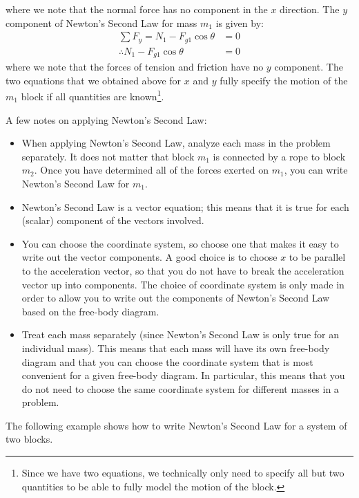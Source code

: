 where we note that the normal force has no component in the $x$ direction. The $y$ component of Newton's Second Law for mass $m_1$ is given by:
\begin{align*}
\sum F_y = N_1-F_{g1}\cos\theta&=0\\
\therefore N_1-F_{g1}\cos\theta&=0
\end{align*}
where we note that the forces of tension and friction have no $y$ component. The two equations that we obtained above for $x$ and $y$ fully specify the motion of the $m_1$ block if all quantities are known\footnote{Since we have two equations, we technically only need to specify all but two quantities to be able to fully model the motion of the block.}.

A few notes on applying Newton's Second Law:
\begin{itemize}
\item When applying Newton's Second Law, analyze each mass in the problem separately. It does not matter that block $m_1$ is connected by a rope to block $m_2$. Once you have determined all of the forces exerted on $m_1$, you can write Newton's Second Law for $m_1$.
\item Newton's Second Law is a vector equation; this means that it is true for each (scalar) component of the vectors involved.
\item You can choose the coordinate system, so choose one that makes it easy to write out the vector components. A good choice is to choose $x$ to be parallel to the acceleration vector, so that you do not have to break the acceleration vector up into components. The choice of coordinate system is only made in order to allow you to write out the components of Newton's Second Law based on the free-body diagram.
\item Treat each mass separately (since Newton's Second Law is only true for an individual mass). This means that each mass will have its own free-body diagram and that you can choose the coordinate system that is most convenient for a given free-body diagram. In particular, this means that you do not need to choose the same coordinate system for different masses in a problem.
\end{itemize}
The following example shows how to write Newton's Second Law for a system of two blocks.

